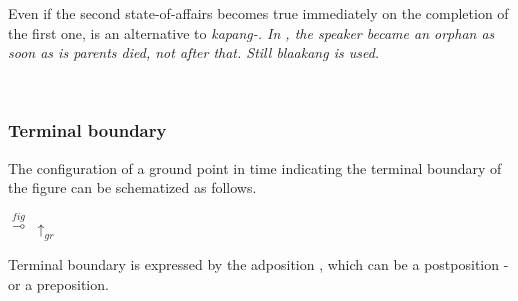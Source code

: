 %
Even if the second state-of-affairs becomes true immediately on the completion of the first one,  is an alternative to \em kapang-\em. In , the speaker became an orphan as soon as is parents died, not after that. Still \em blaakang \em is used.

 \\

\subsubsection{Terminal boundary}\label{sec:func:Terminalboundary}

The configuration of a ground point in time indicating the terminal boundary of the figure can be schematized as follows.

\ea $\stackrel{fig}{\multimap }$\z
 \vspace{-0.6cm}\hspace{1.5cm} $\uparrow_{gr} $

Terminal boundary is expressed by the adposition , which can be a postposition -  or a preposition.





